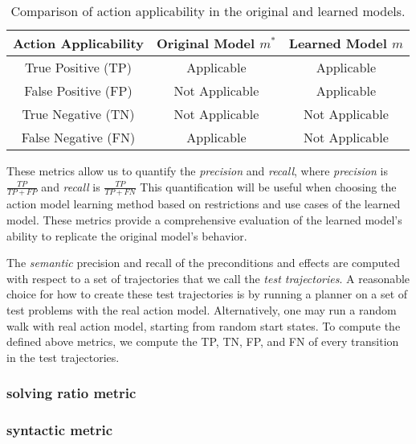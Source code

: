 \begin{table}[h]
    \centering
    \begin{tabular}{|c|c|c|}
        \hline
        \textbf{Action Applicability} & \textbf{Original Model \( m^* \)} & \textbf{Learned Model \( m \)} \\
        \hline
        True Positive (TP) & Applicable & Applicable \\
        False Positive (FP) & Not Applicable & Applicable \\
        True Negative (TN) & Not Applicable & Not Applicable \\
        False Negative (FN) & Applicable & Not Applicable \\
        \hline
    \end{tabular}
    \caption{Comparison of action applicability in the original and learned models.}
    \label{tab:action-model-comparison}
\end{table}
These metrics allow us to quantify the \emph{precision} and \emph{recall}, where \emph{precision} is $\frac{TP}{TP+FP}$ 
and \emph{recall} is $\frac{TP}{TP+FN}$ This quantification will be useful when choosing the action model learning method based on restrictions and use cases of the learned model. These metrics provide a comprehensive evaluation of the learned model's ability to replicate the original model's behavior.

The \emph{semantic} precision and recall of the preconditions and effects are computed with respect to a set of trajectories that we call the \emph{test trajectories}. 
A reasonable choice for how to create these test trajectories is by running a planner on a set of test problems with the real action model. Alternatively, one may run a random walk with real action model, starting from random start states. 
To compute the defined above metrics, we compute the TP, TN, FP, and FN of every transition in the test trajectories. 

\subsubsection{solving ratio metric}
\subsubsection{syntactic metric}





















